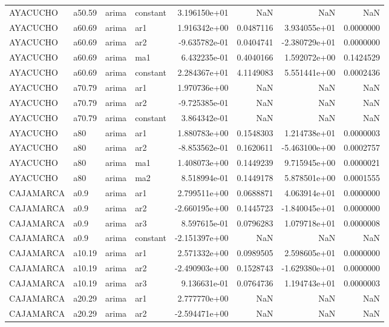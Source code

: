 \documentclass[
]{article}
\begin{document}
\begin{table}[!h]
\begin{tabular}[t]{llllrrrr}
AYACUCHO & a50.59 & arima & constant & 3.196150e+01 & NaN & NaN & NaN\\
\addlinespace
AYACUCHO & a60.69 & arima & ar1 & 1.916342e+00 & 0.0487116 & 3.934055e+01 & 0.0000000\\
AYACUCHO & a60.69 & arima & ar2 & -9.635782e-01 & 0.0404741 & -2.380729e+01 & 0.0000000\\
AYACUCHO & a60.69 & arima & ma1 & 6.432235e-01 & 0.4040166 & 1.592072e+00 & 0.1424529\\
AYACUCHO & a60.69 & arima & constant & 2.284367e+01 & 4.1149083 & 5.551441e+00 & 0.0002436\\
AYACUCHO & a70.79 & arima & ar1 & 1.970736e+00 & NaN & NaN & NaN\\
\addlinespace
AYACUCHO & a70.79 & arima & ar2 & -9.725385e-01 & NaN & NaN & NaN\\
AYACUCHO & a70.79 & arima & constant & 3.864342e-01 & NaN & NaN & NaN\\
AYACUCHO & a80 & arima & ar1 & 1.880783e+00 & 0.1548303 & 1.214738e+01 & 0.0000003\\
AYACUCHO & a80 & arima & ar2 & -8.853562e-01 & 0.1620611 & -5.463100e+00 & 0.0002757\\
AYACUCHO & a80 & arima & ma1 & 1.408073e+00 & 0.1449239 & 9.715945e+00 & 0.0000021\\
\addlinespace
AYACUCHO & a80 & arima & ma2 & 8.518994e-01 & 0.1449178 & 5.878501e+00 & 0.0001555\\
CAJAMARCA & a0.9 & arima & ar1 & 2.799511e+00 & 0.0688871 & 4.063914e+01 & 0.0000000\\
CAJAMARCA & a0.9 & arima & ar2 & -2.660195e+00 & 0.1445723 & -1.840045e+01 & 0.0000000\\
CAJAMARCA & a0.9 & arima & ar3 & 8.597615e-01 & 0.0796283 & 1.079718e+01 & 0.0000008\\
CAJAMARCA & a0.9 & arima & constant & -2.151397e+00 & NaN & NaN & NaN\\
\addlinespace
CAJAMARCA & a10.19 & arima & ar1 & 2.571332e+00 & 0.0989505 & 2.598605e+01 & 0.0000000\\
CAJAMARCA & a10.19 & arima & ar2 & -2.490903e+00 & 0.1528743 & -1.629380e+01 & 0.0000000\\
CAJAMARCA & a10.19 & arima & ar3 & 9.136631e-01 & 0.0764736 & 1.194743e+01 & 0.0000003\\
CAJAMARCA & a20.29 & arima & ar1 & 2.777770e+00 & NaN & NaN & NaN\\
CAJAMARCA & a20.29 & arima & ar2 & -2.594471e+00 & NaN & NaN & NaN\\

\end{tabular}
\end{table}
\end{document}
